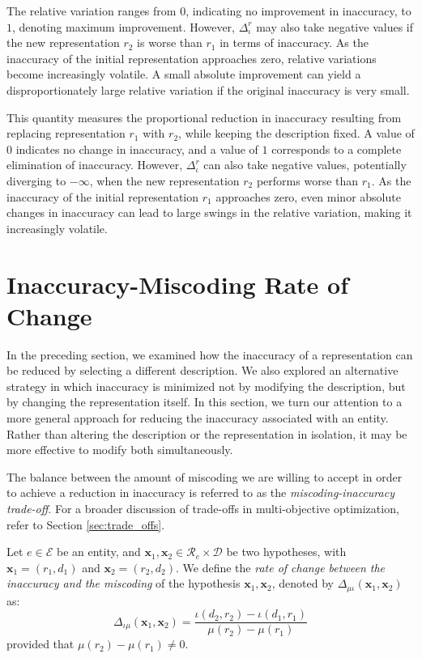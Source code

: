 The relative variation ranges from $0$, indicating no improvement in inaccuracy, to $1$, denoting maximum improvement. However, $\Delta^{r}_{\iota}$ may also take negative values if the new representation $r_2$ is worse than $r_1$ in terms of inaccuracy. As the inaccuracy of the initial representation approaches zero, relative variations become increasingly volatile. A small absolute improvement can yield a disproportionately large relative variation if the original inaccuracy is very small.

This quantity measures the proportional reduction in inaccuracy resulting from replacing representation $r_1$ with $r_2$, while keeping the description fixed. A value of $0$ indicates no change in inaccuracy, and a value of $1$ corresponds to a complete elimination of inaccuracy. However, $\Delta^{r}_{\iota}$ can also take negative values, potentially diverging to $-\infty$, when the new representation $r_2$ performs worse than $r_1$. As the inaccuracy of the initial representation $r_1$ approaches zero, even minor absolute changes in inaccuracy can lead to large swings in the relative variation, making it increasingly volatile.

%
%

\section{Inaccuracy-Miscoding Rate of Change}

In the preceding section, we examined how the inaccuracy of a representation can be reduced by selecting a different description. We also explored an alternative strategy in which inaccuracy is minimized not by modifying the description, but by changing the representation itself. In this section, we turn our attention to a more general approach for reducing the inaccuracy associated with an entity. Rather than altering the description or the representation in isolation, it may be more effective to modify both simultaneously.

The balance between the amount of miscoding we are willing to accept in order to achieve a reduction in inaccuracy is referred to as the \emph{miscoding-inaccuracy trade-off}. For a broader discussion of trade-offs in multi-objective optimization, refer to Section \ref{sec:trade_offs}.

\begin{definition}
Let $e \in \mathcal{E}$ be an entity, and $\mathbf{x}_1, \mathbf{x}_2 \in \mathcal{R}_e \times \mathcal{D}$ be two hypotheses, with $\mathbf{x}_1 = (r_1, d_1)$ and $\mathbf{x}_2 = (r_2, d_2)$. We define the \emph{rate of change between the inaccuracy and the miscoding} of the hypothesis $\mathbf{x}_1, \mathbf{x}_2$, denoted by $\Delta_{\mu \iota} ( \mathbf{x}_1, \mathbf{x}_2 )$ as:
\[
\Delta_{\iota \mu} ( \mathbf{x}_1, \mathbf{x}_2 ) = \frac{\iota(d_2, r_2) - \iota(d_1, r_1)}{\mu(r_2) - \mu(r_1)}
\] 
provided that $\mu(r_2) - \mu(r_1) \neq 0$.
\end{definition}

